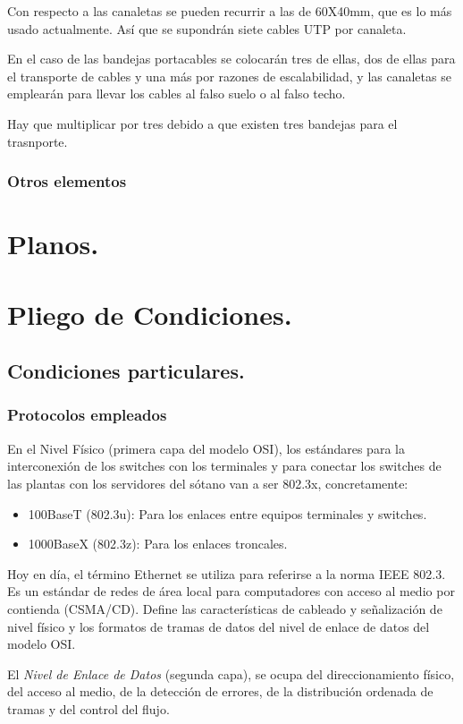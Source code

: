 \documentclass[a4paper,10pt]{article}
\begin{document}
Con respecto a las canaletas se pueden recurrir a las de 60X40mm, que es lo más usado actualmente. Así que se supondrán siete cables UTP por canaleta.

En el caso de las bandejas portacables se colocarán tres de ellas, dos de ellas para el transporte de cables y una más por razones de escalabilidad, y las canaletas se emplearán para llevar los cables al falso suelo o al falso techo.

Hay que multiplicar por tres debido a que existen tres bandejas para el trasnporte.
\subsubsection{Otros elementos}

\section{Planos.}
\section{Pliego de Condiciones.}
\subsection{Condiciones particulares.}
\subsubsection{Protocolos empleados}
En el Nivel Físico (primera capa del modelo OSI), los estándares para la interconexión de los switches con los terminales y para conectar los switches de las plantas con  los servidores del sótano van a ser
802.3x, concretamente:
\begin{itemize}
	\item 100BaseT (802.3u): Para los enlaces entre equipos terminales y switches.
	\item 1000BaseX (802.3z): Para los enlaces troncales.
\end{itemize}
 
Hoy en día, el término Ethernet se utiliza para referirse a la norma IEEE 802.3. Es un estándar de redes de área local para computadores con acceso al medio por contienda (CSMA/CD). Define las características de cableado y señalización de nivel físico y los formatos de tramas de datos del nivel de enlace de datos del modelo OSI.

El \textit{Nivel de Enlace de Datos} (segunda capa), se ocupa del direccionamiento físico, del acceso al medio, de la detección de errores, de la distribución ordenada de tramas y del control del flujo. 
 
\end{document}
